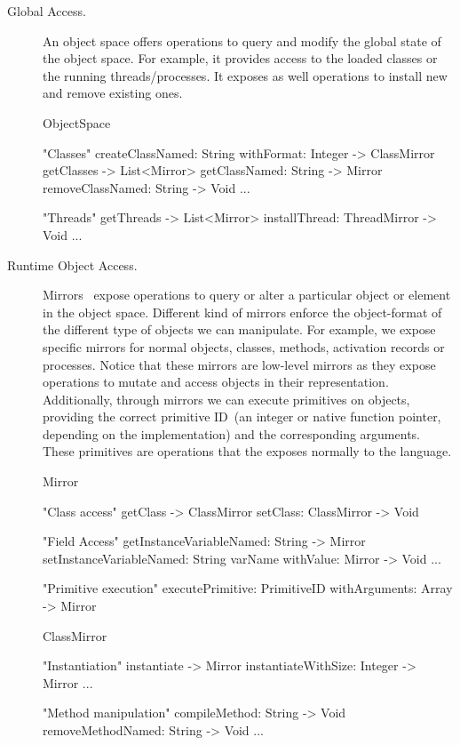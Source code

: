 \begin{description}
\item[Global Access.] An object space offers operations to query and modify the global state of the object space. For example, it provides access to the loaded classes or the running threads/processes. It exposes as well operations to install new and remove existing ones.

\begin{code}
ObjectSpace {
    "Classes"
    createClassNamed: String withFormat: Integer -> ClassMirror
    getClasses -> List<Mirror>
    getClassNamed: String -> Mirror
    removeClassNamed: String -> Void
    ...

    "Threads"
    getThreads -> List<Mirror>
    installThread: ThreadMirror -> Void
    ...
}
\end{code}

\item[Runtime Object Access.] Mirrors~\cite{Brac04b} expose operations to query or alter a particular object or element in the object space. Different kind of mirrors enforce the object-format of the different type of objects we can manipulate. For example, we expose specific mirrors for normal objects, classes, methods, activation records or processes. Notice that these mirrors are low-level mirrors as they expose operations to mutate and access objects in their \VM representation. Additionally, through mirrors we can execute \VM primitives on objects, providing the correct primitive ID~(an integer or native function pointer, depending on the implementation) and the corresponding arguments. These primitives are operations that the \VM exposes normally to the language.

\begin{code}
Mirror {
    "Class access"
    getClass -> ClassMirror
    setClass: ClassMirror -> Void

    "Field Access"
    getInstanceVariableNamed: String -> Mirror
    setInstanceVariableNamed: String varName withValue: Mirror -> Void
    ...
    
    "Primitive execution"
    executePrimitive: PrimitiveID withArguments: Array -> Mirror
}
\end{code}

\begin{code}
ClassMirror {
    "Instantiation"
    instantiate -> Mirror
    instantiateWithSize: Integer -> Mirror
    ...

    "Method manipulation"    
    compileMethod: String -> Void
    removeMethodNamed: String -> Void
    ...
}
\end{code}

\end{description}

